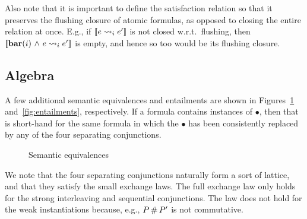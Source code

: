 \documentclass[11pt]{report}
\begin{document}
Also note that it is important to define the satisfaction relation so that it preserves the flushing closure of atomic formulas, as opposed to closing the entire relation at once. E.g., if $[\![e \leadsto_{i} e']\!]$ is not closed w.r.t.~flushing, then $[\![\mathbf{bar}(i) \operatorname{\,\wedge\,} e \leadsto_{i} e']\!]$ is empty, and hence so too would be its flushing closure.  

\subsection{Algebra}
\label{sec:algebra}

A few additional semantic equivalences and entailments are shown in Figures~\ref{fig:equivalences} and~\ref{fig:entailments}, respectively. If a formula contains instances of $\bullet$, then that is short-hand for the same formula in which the $\bullet$ has been consistently replaced by any of the four separating conjunctions. 

\begin{figure}[ht]
	\centering
	\caption{\label{fig:equivalences}Semantic equivalences}
\end{figure}

We note that the four separating conjunctions naturally form a sort of lattice, and that they satisfy the small exchange laws. The full exchange law only holds for the strong interleaving and sequential conjunctions. The law does not hold for the weak instantiations because, e.g., $P \operatorname{\#} P'$ is not commutative. 
\end{document}
